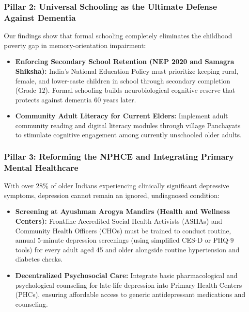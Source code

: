 \subsubsection{Pillar 2: Universal Schooling as the Ultimate Defense Against Dementia}
Our findings show that formal schooling completely eliminates the childhood poverty gap in memory-orientation impairment:
\begin{itemize}
    \item \textbf{Enforcing Secondary School Retention (NEP 2020 and Samagra Shiksha):} India's National Education Policy must prioritize keeping rural, female, and lower-caste children in school through secondary completion (Grade 12). Formal schooling builds neurobiological cognitive reserve that protects against dementia 60 years later.
    \item \textbf{Community Adult Literacy for Current Elders:} Implement adult community reading and digital literacy modules through village Panchayats to stimulate cognitive engagement among currently unschooled older adults.
\end{itemize}

\subsubsection{Pillar 3: Reforming the NPHCE and Integrating Primary Mental Healthcare}
With over 28\% of older Indians experiencing clinically significant depressive symptoms, depression cannot remain an ignored, undiagnosed condition:
\begin{itemize}
    \item \textbf{Screening at Ayushman Arogya Mandirs (Health and Wellness Centers):} Frontline Accredited Social Health Activists (ASHAs) and Community Health Officers (CHOs) must be trained to conduct routine, annual 5-minute depression screenings (using simplified CES-D or PHQ-9 tools) for every adult aged 45 and older alongside routine hypertension and diabetes checks.
    \item \textbf{Decentralized Psychosocial Care:} Integrate basic pharmacological and psychological counseling for late-life depression into Primary Health Centers (PHCs), ensuring affordable access to generic antidepressant medications and counseling.
\end{itemize}

